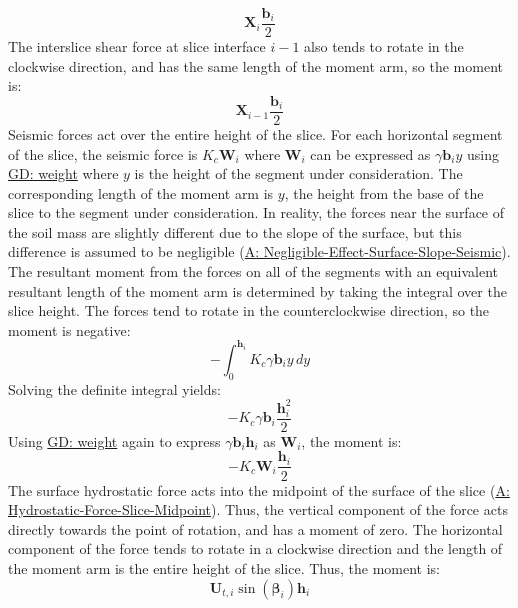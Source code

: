\documentclass[12pt]{article}
\begin{document}
\begin{displaymath}
{\mathbf{X}}_{i} \frac{{\mathbf{b}}_{i}}{2}
\end{displaymath}
The interslice shear force at slice interface $i-1$ also tends to rotate in the clockwise direction, and has the same length of the moment arm, so the moment is:
\begin{displaymath}
{\mathbf{X}}_{i-1} \frac{{\mathbf{b}}_{i}}{2}
\end{displaymath}
Seismic forces act over the entire height of the slice. For each horizontal segment of the slice, the seismic force is ${K_{c}} {\mathbf{W}}_{i}$ where ${\mathbf{W}}_{i}$ can be expressed as $γ {\mathbf{b}}_{i} y$ using \hyperref[GD:weight]{GD: weight} where $y$ is the height of the segment under consideration. The corresponding length of the moment arm is $y$, the height from the base of the slice to the segment under consideration. In reality, the forces near the surface of the soil mass are slightly different due to the slope of the surface, but this difference is assumed to be negligible (\hyperref[assumpNESSS]{A: Negligible-Effect-Surface-Slope-Seismic}). The resultant moment from the forces on all of the segments with an equivalent resultant length of the moment arm is determined by taking the integral over the slice height. The forces tend to rotate in the counterclockwise direction, so the moment is negative:
\begin{displaymath}
-\int_{0}^{{\mathbf{h}}_{i}}{{K_{c}} γ {\mathbf{b}}_{i} y}\,dy
\end{displaymath}
Solving the definite integral yields:
\begin{displaymath}
-{K_{c}} γ {\mathbf{b}}_{i} \frac{{\mathbf{h}}_{i}^{2}}{2}
\end{displaymath}
Using \hyperref[GD:weight]{GD: weight} again to express $γ {\mathbf{b}}_{i} {\mathbf{h}}_{i}$ as ${\mathbf{W}}_{i}$, the moment is:
\begin{displaymath}
-{K_{c}} {\mathbf{W}}_{i} \frac{{\mathbf{h}}_{i}}{2}
\end{displaymath}
The surface hydrostatic force acts into the midpoint of the surface of the slice (\hyperref[assumpHFSM]{A: Hydrostatic-Force-Slice-Midpoint}). Thus, the vertical component of the force acts directly towards the point of rotation, and has a moment of zero. The horizontal component of the force tends to rotate in a clockwise direction and the length of the moment arm is the entire height of the slice. Thus, the moment is:
\begin{displaymath}
{\mathbf{U}_{t,i}} \sin\left({\mathbf{β}}_{i}\right) {\mathbf{h}}_{i}
\end{displaymath}
\end{document}
